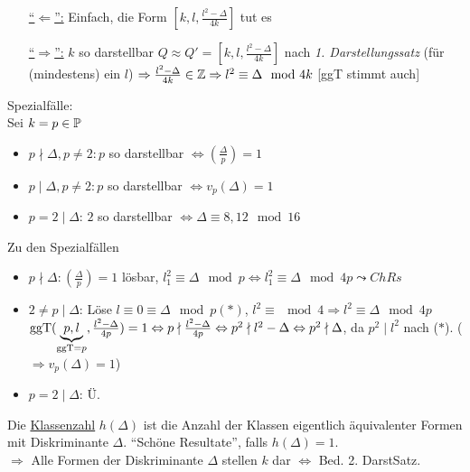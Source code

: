 \documentclass[a4paper,twoside,DIV15,BCOR12mm]{scrbook}
\begin{document}
\begin{beweis}
\begin{itemize}
\item[\underline{"`$\Leftarrow$"':}] Einfach, die Form $[k, l, \frac{l^2 - \Delta}{4k}]$ tut es
\item[\underline{"`$\Rightarrow$"':}] $k$ so darstellbar $Q \approx Q' = [k, l, \frac{l^2 - \Delta}{4k}]$ nach \emph{1. Darstellungssatz} (für (mindestens) ein $l$) $\Rightarrow \frac{l^2 - \Delta}{4k} \in \mathbb{Z} \Rightarrow l^2 \equiv \Delta \mod 4k$ [ggT stimmt auch]
\end{itemize}
\end{beweis}

Spezialfälle:\\
Sei $k = p \in \mathbb{P}$
\begin{itemize}
\item $p \nmid \Delta, p \not= 2: p$ so darstellbar $\Leftrightarrow (\frac{\Delta}{p}) = 1$
\item $p \mid \Delta, p \not= 2: p$ so darstellbar $\Leftrightarrow v_p(\Delta) = 1$
\item $p = 2 \mid \Delta$: $2$ so darstellbar $\Leftrightarrow \Delta \equiv 8, 12 \mod 16$
\end{itemize}

Zu den Spezialfällen
\begin{itemize}
\item $p \nmid \Delta: (\frac{\Delta}{p}) = 1$ lösbar, $l_1^2 \equiv \Delta \mod p \Leftrightarrow l_1^2 \equiv \Delta \mod 4p \leadsto ChRs$
\item $2 \not= p \mid \Delta$: Löse $l \equiv 0 \equiv \Delta \mod p (\ast)$, $l^2 \equiv \mod 4 \Rightarrow l^2 \equiv \Delta \mod 4p$\\
$\mathop{\rm ggT}\nolimits (\underbrace{p, l}_{\mathop{\rm ggT}\nolimits = p}, \frac{l^2 - \Delta}{4p}) = 1 \Leftrightarrow p \nmid \frac{l^2 - \Delta}{4p} \Leftrightarrow p^2 \nmid l^2 - \Delta \Leftrightarrow p^2 \nmid \Delta$, da $p^2 \mid l^2$ nach ($\ast$). ($\Rightarrow v_p(\Delta) = 1$)
\item $p = 2 \mid \Delta$: Ü.
\end{itemize}

\begin{definition}
Die \underline{Klassenzahl} $h(\Delta)$ ist die Anzahl der Klassen eigentlich äquivalenter Formen mit Diskriminante $\Delta$. "`Schöne Resultate"', falls $h(\Delta) = 1$.\\
$\Rightarrow$ Alle Formen der Diskriminante $\Delta$ stellen $k$ dar $\Leftrightarrow$ Bed. 2. DarstSatz.
\end{definition}
\end{document}
